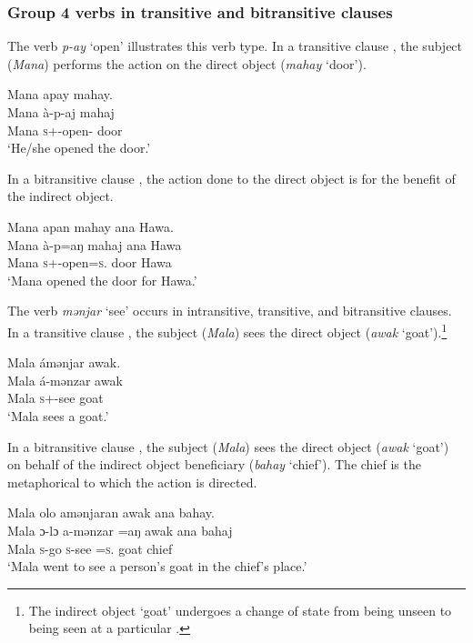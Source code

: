\subsubsection{Group 4 verbs in transitive and bitransitive clauses}\label{sec:9.2.4.1}

The verb \textit{p-ay} ‘open’ illustrates this verb type. In a transitive clause , the subject (\textit{Mana}) performs the action on the direct object (\textit{mahay} ‘door’). 


\ea \label{ex:9:15}
Mana  apay  mahay.\\
\gll  Mana   à-p-aj    mahaj\\
      Mana  \textsc{s}+{\PFV}-open{}-{\CL}  door\\
\glt  ‘He/she opened the door.’ 
\z

In a bitransitive clause , the action done to the direct object is for the benefit of the indirect object.

\ea \label{ex:9:16}
Mana  apan  mahay  ana  Hawa.\\
\gll  Mana   à-p=aŋ      mahaj  ana  Hawa\\
      Mana  \textsc{s}+{\PFV}-open=\textsc{s}.{\IO}  door  {\DAT} Hawa\\
\glt  ‘Mana opened the door for Hawa.’ 
\z

The verb \textit{mənjar} ‘see’ occurs in intransitive, transitive, and bitransitive clauses. In a transitive clause , the subject (\textit{Mala}) sees the direct object (\textit{awak} ‘goat’).\footnote{The indirect object ‘goat’ undergoes a change of state from being unseen to being seen at a particular \LOC.} 

\ea \label{ex:9:17}
Mala  ámənjar  awak.\\
\gll  Mala á-mənzar   awak\\
      Mala  \textsc{s}+{\IFV}-see  goat\\
\glt  ‘Mala sees a goat.’{ }
\z

In a bitransitive clause , the subject (\textit{Mala}) sees the direct object (\textit{awak} ‘goat’) on behalf of the indirect object beneficiary (\textit{bahay} ‘chief’). The chief is the metaphorical \LOC to which the action is directed.

\ea \label{ex:9:18}
Mala  olo  amənjaran  awak  ana  bahay.\\
\gll  Mala  ɔ{}-lɔ    a-mənzar =aŋ  awak  ana  bahaj\\
      Mala  \textsc{s}-go  \textsc{s}-see =\textsc{s}.{\IO}  goat  {\DAT} chief\\
\glt  ‘Mala went to see a person’s goat in the chief’s place.’{ }
\z

